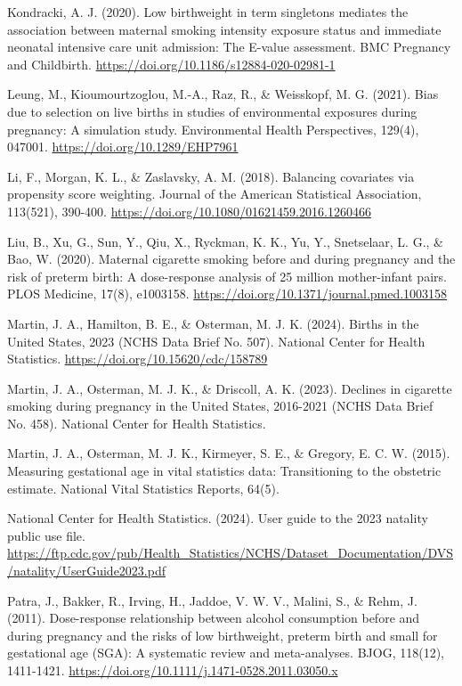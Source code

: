 {Kondracki, A. J. (2020). Low birthweight in term singletons mediates the association between maternal smoking intensity exposure status and immediate neonatal intensive care unit admission: The E-value assessment. BMC Pregnancy and Childbirth. \url{https://doi.org/10.1186/s12884-020-02981-1}

Leung, M., Kioumourtzoglou, M.-A., Raz, R., \& Weisskopf, M. G. (2021). Bias due to selection on live births in studies of environmental exposures during pregnancy: A simulation study. Environmental Health Perspectives, 129(4), 047001. \url{https://doi.org/10.1289/EHP7961}

Li, F., Morgan, K. L., \& Zaslavsky, A. M. (2018). Balancing covariates via propensity score weighting. Journal of the American Statistical Association, 113(521), 390-400. \url{https://doi.org/10.1080/01621459.2016.1260466}

Liu, B., Xu, G., Sun, Y., Qiu, X., Ryckman, K. K., Yu, Y., Snetselaar, L. G., \& Bao, W. (2020). Maternal cigarette smoking before and during pregnancy and the risk of preterm birth: A dose-response analysis of 25 million mother-infant pairs. PLOS Medicine, 17(8), e1003158. \url{https://doi.org/10.1371/journal.pmed.1003158}

Martin, J. A., Hamilton, B. E., \& Osterman, M. J. K. (2024). Births in the United States, 2023 (NCHS Data Brief No. 507). National Center for Health Statistics. \url{https://doi.org/10.15620/cdc/158789}

Martin, J. A., Osterman, M. J. K., \& Driscoll, A. K. (2023). Declines in cigarette smoking during pregnancy in the United States, 2016-2021 (NCHS Data Brief No. 458). National Center for Health Statistics.

Martin, J. A., Osterman, M. J. K., Kirmeyer, S. E., \& Gregory, E. C. W. (2015). Measuring gestational age in vital statistics data: Transitioning to the obstetric estimate. National Vital Statistics Reports, 64(5).

National Center for Health Statistics. (2024). User guide to the 2023 natality public use file. \url{https://ftp.cdc.gov/pub/Health_Statistics/NCHS/Dataset_Documentation/DVS/natality/UserGuide2023.pdf}

Patra, J., Bakker, R., Irving, H., Jaddoe, V. W. V., Malini, S., \& Rehm, J. (2011). Dose-response relationship between alcohol consumption before and during pregnancy and the risks of low birthweight, preterm birth and small for gestational age (SGA): A systematic review and meta-analyses. BJOG, 118(12), 1411-1421. \url{https://doi.org/10.1111/j.1471-0528.2011.03050.x}

}
